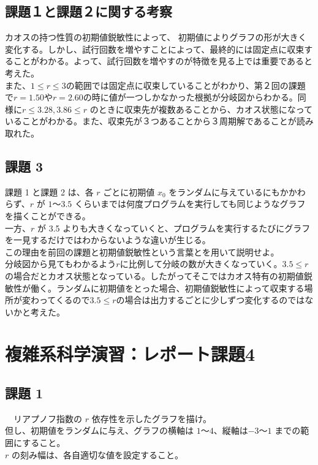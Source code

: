 \documentclass[dvipdfmx,uplatex]{jsarticle}
\begin{document}
\newpage

\subsection{課題１と課題２に関する考察}
カオスの持つ性質の初期値鋭敏性によって、 初期値によりグラフの形が大きく変化する。しかし、試行回数を増やすことによって、最終的には固定点に収束することがわかる。よって、試行回数を増やすのが特徴を見る上では重要であると考えた。\\
また、$1 ≤ r ≤ 3$の範囲では固定点に収束していることがわかり、第２回の課題で$r=1.50$や$r=2.60$の時に値が一つしかなかった根拠が分岐図からわかる。同様に$r ≤ 3.28,3.86 ≤ r$ のときに収束先が複数あることから、カオス状態になっていることがわかる。また、収束先が３つあることから３周期解であることが読み取れた。

\newpage

\subsection{課題 3}
  課題 1 と課題 2 は、各 $r$ ごとに初期値 $x_{0}$ をランダムに与えているにもかかわらず、$r$ が $1$～$3.5$ くらいまでは何度プログラムを実行しても同じようなグラフを描くことができる。\\
一方、$r$ が 3.5 よりも大きくなっていくと、プログラムを実行するたびにグラフを一見するだけではわからないような違いが生じる。\\
この理由を前回の課題と初期値鋭敏性という言葉とを用いて説明せよ。\\


分岐図から見てもわかるよう$r$に比例して分岐の数が大きくなっていく。$3.5 ≤ r$の場合だとカオス状態となっている。したがってそこではカオス特有の初期値鋭敏性が働く。ランダムに初期値をとった場合、初期値鋭敏性によって収束する場所が変わってくるので$3.5 ≤ r$の場合は出力するごとに少しずつ変化するのではないかと考えた。

\newpage

\section{複雑系科学演習：レポート課題4}

\subsection{課題 1}
　リアプノフ指数の $r$ 依存性を示したグラフを描け。\\
但し、初期値をランダムに与え、グラフの横軸は $1$～$4$、縦軸は$-3$～$1$ までの範囲にすること。\\
$r$ の刻み幅は、各自適切な値を設定すること。\\
\end{document}
